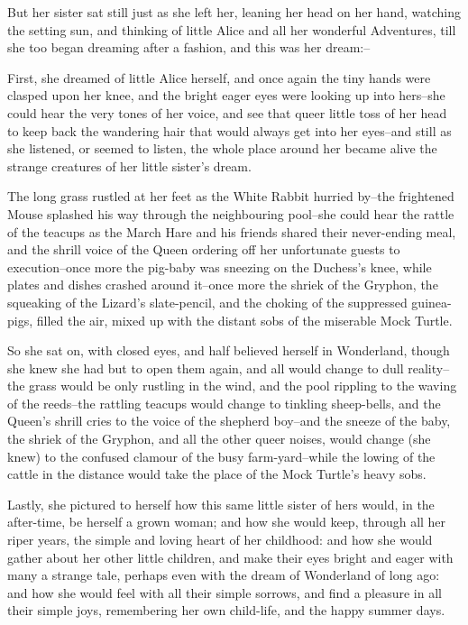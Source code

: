 \documentclass[statementpaper,twoside,openany]{memoir}
\begin{document}
But her sister sat still just as she left her, leaning her head on her hand, watching the setting sun, and thinking of little Alice and all her wonderful Adventures, till she too began dreaming after a fashion, and this was her dream:--

First, she dreamed of little Alice herself, and once again the tiny hands were clasped upon her knee, and the bright eager eyes were looking up into hers--she could hear the very tones of her voice, and see that queer little toss of her head to keep back the wandering hair that would always get into her eyes--and still as she listened, or seemed to listen, the whole place around her became alive the strange creatures of her little sister's dream.

The long grass rustled at her feet as the White Rabbit hurried by--the frightened Mouse splashed his way through the neighbouring pool--she could hear the rattle of the teacups as the March Hare and his friends shared their never-ending meal, and the shrill voice of the Queen ordering off her unfortunate guests to execution--once more the pig-baby was sneezing on the Duchess's knee, while plates and dishes crashed around it--once more the shriek of the Gryphon, the squeaking of the Lizard's slate-pencil, and the choking of the suppressed guinea-pigs, filled the air, mixed up with the distant sobs of the miserable Mock Turtle.

So she sat on, with closed eyes, and half believed herself in Wonderland, though she knew she had but to open them again, and all would change to dull reality--the grass would be only rustling in the wind, and the pool rippling to the waving of the reeds--the rattling teacups would change to tinkling sheep-bells, and the Queen's shrill cries to the voice of the shepherd boy--and the sneeze of the baby, the shriek of the Gryphon, and all the other queer noises, would change (she knew) to the confused clamour of the busy farm-yard--while the lowing of the cattle in the distance would take the place of the Mock Turtle's heavy sobs.

Lastly, she pictured to herself how this same little sister of hers would, in the after-time, be herself a grown woman; and how she would keep, through all her riper years, the simple and loving heart of her childhood: and how she would gather about her other little children, and make their eyes bright and eager with many a strange tale, perhaps even with the dream of Wonderland of long ago: and how she would feel with all their simple sorrows, and find a pleasure in all their simple joys, remembering her own child-life, and the happy summer days.
\end{document}
